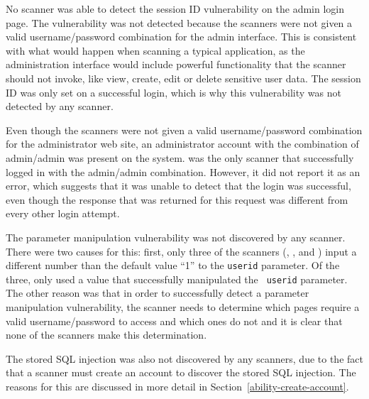 No scanner was able to detect the session ID vulnerability on the
admin login page. The vulnerability was not detected because the scanners were not given a
valid username/password combination for the admin interface. This
is consistent with what would happen when scanning a typical application, as the
administration interface would include powerful functionality that the scanner
should not invoke, like view, create, edit or delete
sensitive user data.
The session ID was only set on a
successful login, which is why this vulnerability was not detected by any scanner.


Even though the scanners were not given a valid username/password combination
for the administrator web site, an administrator account with the
 combination of admin/admin was present on the system.
\ntospider{} was the only scanner that successfully logged in with the
admin/admin combination. However, it did not report it as an error, which
suggests that it was unable to detect that the login was successful, even
though the response that was returned for this request was different from every other login
attempt.

The parameter manipulation vulnerability was not discovered by any 
scanner. There were two causes for this: first, only three of the
scanners (\appscan{}, \ntospider{}, and \waf{})
input a different number than the default value ``1'' to the {\tt userid}
parameter. Of the 
three, only \ntospider{} used a value that successfully manipulated the {\tt
  userid} parameter. The other reason  was that in order to
successfully detect a parameter manipulation vulnerability, the scanner needs
to determine which pages require a valid username/password to access and which
ones do not and it is clear that none of the scanners make
this determination.

The stored SQL injection was also not discovered by any scanners, due to the
fact that a scanner must create an account to discover the stored SQL
injection. The reasons for this are discussed in more detail in
Section~\ref{ability-create-account}.

